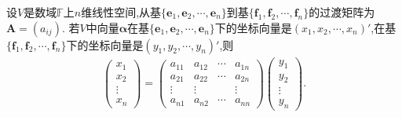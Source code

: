 \documentclass[../../main.tex]{subfiles}%
\begin{document}
\begin{theorem}[同一向量在不同基下坐标向量的关系]\label{theorem:同一向量在不同基下坐标向量的关系}
设\(V\)是数域\(\mathbb{F}\)上\(n\)维线性空间,从基\(\{\boldsymbol{e}_1,\boldsymbol{e}_2,\cdots,\boldsymbol{e}_n\}\)到基\(\{\boldsymbol{f}_1,\boldsymbol{f}_2,\cdots,\boldsymbol{f}_n\}\)的过渡矩阵为\(\boldsymbol{A}=(a_{ij})\). 若\(V\)中向量\(\boldsymbol{\alpha}\)在基\(\{\boldsymbol{e}_1,\boldsymbol{e}_2,\cdots,\boldsymbol{e}_n\}\)下的坐标向量是\((x_1,x_2,\cdots,x_n)'\),在基\(\{\boldsymbol{f}_1,\boldsymbol{f}_2,\cdots,\boldsymbol{f}_n\}\)下的坐标向量是\((y_1,y_2,\cdots,y_n)'\),则
\begin{gather*}
\begin{pmatrix}
x_1\\
x_2\\
\vdots\\
x_n
\end{pmatrix}=\begin{pmatrix}
a_{11}&a_{12}&\cdots&a_{1n}\\
a_{21}&a_{22}&\cdots&a_{2n}\\
\vdots&\vdots&&\vdots\\
a_{n1}&a_{n2}&\cdots&a_{nn}
\end{pmatrix}\begin{pmatrix}
y_1\\
y_2\\
\vdots\\
y_n
\end{pmatrix}.
\end{gather*}
\end{theorem}
\end{document}
